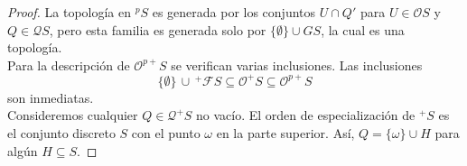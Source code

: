 \begin{proof}
    La topología en $^pS$ es generada por los conjuntos $U\cap Q'$ para $U\in \mathcal{O}S$ y $Q\in \mathcal{Q}S$, pero esta familia es generada solo por $\{\emptyset\}\cup GS$, la cual es una topología.\\

    Para la descripción de $\mathcal{O}^{p+}S$ se verifican varias inclusiones. Las inclusiones
    \[
    \{\emptyset\}\,\cup\, ^+\mathcal{F}S\subseteq\mathcal{O}^+S\subseteq\mathcal{O}^{p+}S
    \]
    son inmediatas.\\

    Consideremos cualquier $Q\in \mathcal{Q}^+S$ no vacío. El orden de especialización de $^+S$ es el conjunto discreto $S$ con el punto $\omega$ en la parte superior. Así, $Q=\{\omega\}\cup H$ para algún $H\subseteq S$. 
\end{proof}